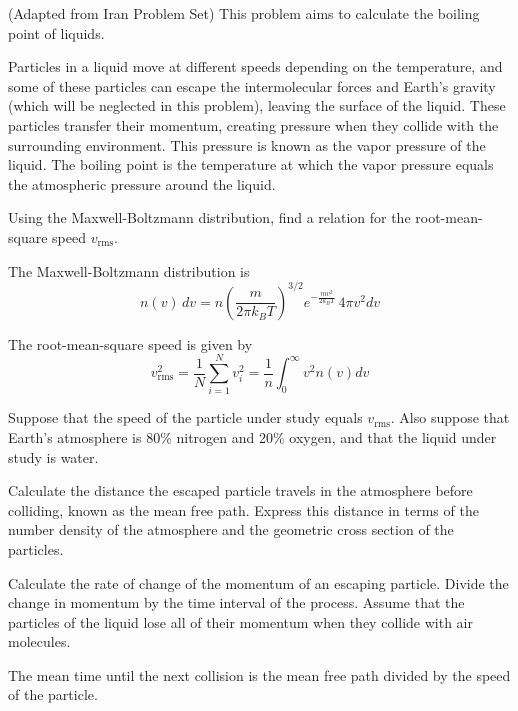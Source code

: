 \documentclass[11pt]{article}
\begin{document}
\begin{pproblem} (Adapted from Iran Problem Set)
    This problem aims to calculate the boiling point of liquids.

Particles in a liquid move at different speeds depending on the temperature, and some of these particles can escape the intermolecular forces and Earth's gravity (which will be neglected in this problem), leaving the surface of the liquid. These particles transfer their momentum, creating pressure when they collide with the surrounding environment. This pressure is known as the vapor pressure of the liquid. The boiling point is the temperature at which the vapor pressure equals the atmospheric pressure around the liquid.

\begin{alternativas}
\item Using the Maxwell-Boltzmann distribution, find a relation for the root-mean-square speed $v_{\text{rms}}$.

The Maxwell-Boltzmann distribution is
\begin{equation}
    n(v) \, dv = n \left(\frac{m}{2\pi k_B T}\right)^{3/2} e^{-\frac{mv^2}{2k_BT}} \, 4\pi v^2 dv
\end{equation}

The root-mean-square speed is given by
\begin{equation}
    v_{\text{rms}}^2 = \frac{1}{N} \sum_{i=1}^N v_i^2 = \frac{1}{n} \int_0^\infty v^2 n(v) dv
\end{equation}

\item Suppose that the speed of the particle under study equals $v_{\text{rms}}$. Also suppose that Earth's atmosphere is 80\% nitrogen and 20\% oxygen, and that the liquid under study is water.

Calculate the distance the escaped particle travels in the atmosphere before colliding, known as the mean free path. Express this distance in terms of the number density of the atmosphere and the geometric cross section of the particles.

\item Calculate the rate of change of the momentum of an escaping particle. Divide the change in momentum by the time interval of the process. Assume that the particles of the liquid lose all of their momentum when they collide with air molecules.

The mean time until the next collision is the mean free path divided by the speed of the particle.


\end{alternativas}
\end{pproblem}
\end{document}
